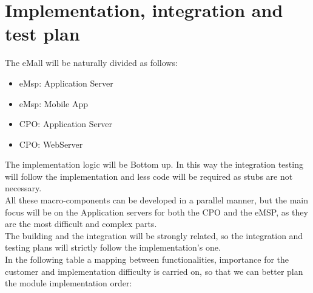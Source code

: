 \section{Implementation, integration and test plan}
The eMall will be naturally divided as follows:
\begin{itemize}
    \item eMsp: Application Server
    \item eMsp: Mobile App
    \item CPO: Application Server
    \item CPO: WebServer
\end{itemize}
The implementation logic will be Bottom up. In this way the integration testing will follow the implementation and less code will be required as stubs are not necessary.\\
All these macro-components can be developed in a parallel manner, but the main focus will be on the Application servers for both the CPO and the eMSP, as they are the most difficult and complex parts.\\
The building and the integration will be strongly related, so the integration and testing plans will strictly follow the implementation's one.\\
In the following table a mapping between functionalities, importance for the customer and implementation difficulty is carried on, so that we can better plan the module implementation order:\\

